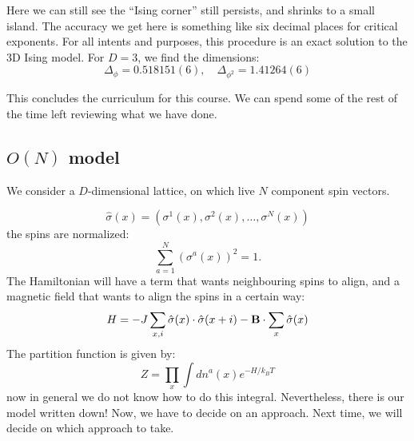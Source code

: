 Here we can still see the ``Ising corner'' still persists, and shrinks to a small island. The accuracy we get here is something like six decimal places for critical exponents. For all intents and purposes, this procedure is an exact solution to the 3D Ising model. For $D = 3$, we find the dimensions:
\begin{equation}
    \Delta_\phi = 0.518151(6), \quad \Delta_{\phi^2} = 1.41264(6)
\end{equation}

This concludes the curriculum for this course. We can spend some of the rest of the time left reviewing what we have done.

\subsection{$O(N)$ model}
We consider a $D$-dimensional lattice, on which live $N$ component spin vectors.

\begin{equation}
    \hat{\sigma}(x) = (\sigma^1(x), \sigma^2(x), \ldots, \sigma^N(x))
\end{equation}
the spins are normalized:
\begin{equation}
    \sum_{a=1}^N (\sigma^a(x))^2 = 1.
\end{equation}
The Hamiltonian will have a term that wants neighbouring spins to align, and a magnetic field that wants to align the spins in a certain way:
\begin{equation}
    H = -J\sum_{x, i}\hat{\sigma}(x)\cdot \hat{\sigma}(x + i) - \mathbf{B} \cdot \sum_x \hat{\sigma}(x)
\end{equation}
The partition function is given by:
\begin{equation}
    Z = \prod_x \int dn^a(x) e^{-H/k_B T}
\end{equation}
now in general we do not know how to do this integral. Nevertheless, there is our model written down! Now, we have to decide on an approach. Next time, we will decide on which approach to take.